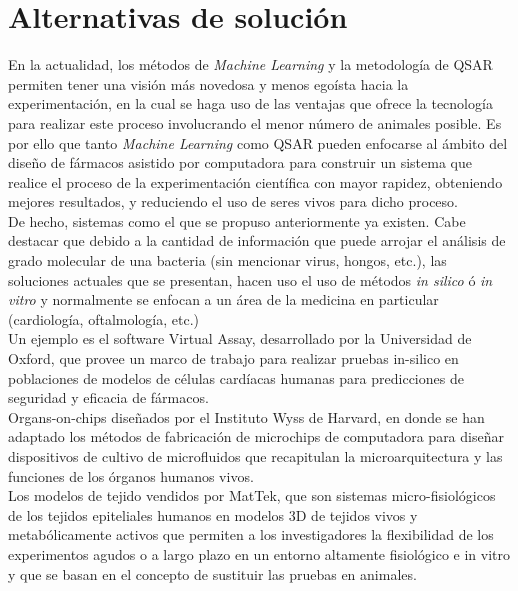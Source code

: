 \section{Alternativas de solución}
\noindent En la actualidad, los métodos de \textit{Machine Learning} y la metodología de QSAR permiten tener una visión más novedosa y menos egoísta hacia la experimentación, en la cual se haga uso de las ventajas que ofrece la tecnología para realizar este proceso involucrando el menor número de animales posible.
Es por ello que tanto \textit{Machine Learning} como QSAR pueden enfocarse al ámbito del diseño de fármacos asistido por computadora para construir un sistema que realice el proceso de la experimentación científica con mayor rapidez, obteniendo mejores resultados, y reduciendo el uso de seres vivos para dicho proceso.\\

\noindent De hecho, sistemas como el que se propuso anteriormente ya existen. Cabe destacar que debido a la cantidad de información que puede arrojar el análisis de grado molecular de una bacteria (sin mencionar virus, hongos, etc.), las soluciones actuales que se presentan, hacen uso el uso de métodos \textit{in silico} ó \textit{in vitro} y normalmente se enfocan a un área de la medicina en particular (cardiología, oftalmología, etc.)\\

\noindent Un ejemplo es el software Virtual Assay, desarrollado por la Universidad de Oxford, que provee un marco de trabajo para realizar pruebas in-silico en poblaciones de modelos de células cardíacas humanas para predicciones de seguridad y eficacia de fármacos.\\

\noindent Organs-on-chips diseñados por el Instituto Wyss de Harvard, en donde se han adaptado los métodos de fabricación de microchips de computadora para diseñar dispositivos de cultivo de microfluidos que recapitulan la microarquitectura y las funciones de los órganos humanos vivos.\\

\noindent Los modelos de tejido vendidos por MatTek, que son sistemas micro-fisiológicos de los tejidos epiteliales humanos en modelos 3D de tejidos vivos y metabólicamente activos que permiten a los investigadores la flexibilidad de los experimentos agudos o a largo plazo en un entorno altamente fisiológico e in vitro y que se basan en el concepto de sustituir las pruebas en animales.\\

